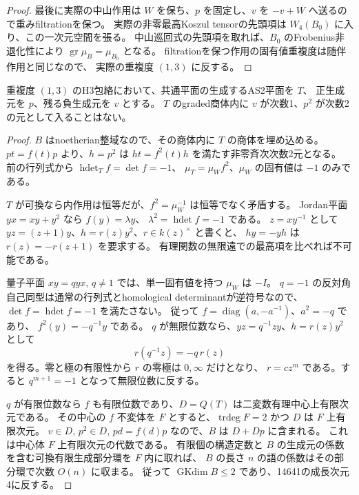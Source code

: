 \begin{proof}
最後に実際の中山作用は $W$ を保ち、$p$ を固定し、$v$ を $-v+W$ へ送るので重みfiltrationを保つ。
実際の非零最高Koszul tensorの先頭項は $W_4(B_0)$ に入り、この一次元空間を張る。
中山巡回式の先頭項を取れば、$B_0$ のFrobenius非退化性により
$\operatorname{gr}\mu_B=\mu_{B_0}$ となる。
filtrationを保つ作用の固有値重複度は随伴作用と同じなので、
実際の重複度 $(1,3)$ に反する。
\end{proof}

\begin{lemma}[共通平面の商体への退化は起こらない]
\label{lem:h3-order2-rational-collapse}
重複度 $(1,3)$ のH3包絡において、共通平面の生成するAS2平面を $T$、
正生成元を $p$、残る負生成元を $v$ とする。
$T$ のgraded商体内に $v$ が次数1、$p^2$ が次数2の元として入ることはない。
\end{lemma}
\begin{proof}
$B$ はnoetherian整域なので、その商体内に $T$ の商体を埋め込める。
$pt=f(t)p$ より、$h=p^2$ は $ht=f^2(t)h$ を満たす非零斉次次数2元となる。
前の行列式から $\operatorname{hdet}_T f=\det f=-1$、
$\mu_T=\mu_W f^2$、$\mu_W$ の固有値は $-1$ のみである。

$T$ が可換なら内作用は恒等だが、$f^2=\mu_W^{-1}$ は恒等でなく矛盾する。
Jordan平面 $yx=xy+y^2$ なら $f(y)=\lambda y$、
$\lambda^2=\operatorname{hdet}f=-1$ である。
$z=xy^{-1}$ として $yz=(z+1)y$、$h=r(z)y^2$、$r\in k(z)^\times$ と書くと、
$hy=-yh$ は $r(z)=-r(z+1)$ を要求する。
有理関数の無限遠での最高項を比べれば不可能である。

量子平面 $xy=qyx$, $q\ne1$ では、単一固有値を持つ $\mu_W$ は $-I$。
$q=-1$ の反対角自己同型は通常の行列式とhomological determinantが逆符号なので、
$\det f=\operatorname{hdet}f=-1$ を満たさない。
従って $f=\operatorname{diag}(a,-a^{-1})$、$a^2=-q$ であり、
$f^2(y)=-q^{-1}y$ である。
$q$ が無限位数なら、$yz=q^{-1}zy$、$h=r(z)y^2$ として
\[
 r(q^{-1}z)=-q\,r(z)
\]
を得る。零と極の有限性から $r$ の零極は $0,\infty$ だけとなり、
$r=cz^m$ である。すると $q^{m+1}=-1$ となって無限位数に反する。

$q$ が有限位数なら $f$ も有限位数であり、$D=Q(T)$ は二変数有理中心上有限次元である。
その中心の $f$ 不変体を $F$ とすると、$\operatorname{trdeg}F=2$ かつ $D$ は $F$ 上有限次元。
$v\in D$, $p^2\in D$, $pd=f(d)p$ なので、$B$ は $D+Dp$ に含まれる。
これは中心体 $F$ 上有限次元の代数である。
有限個の構造定数と $B$ の生成元の係数を含む可換有限生成部分環を $F$ 内に取れば、
$B$ の長さ $n$ の語の係数はその部分環で次数 $O(n)$ に収まる。
従って $\operatorname{GKdim}B\le2$ であり、14641の成長次元4に反する。
\end{proof}

